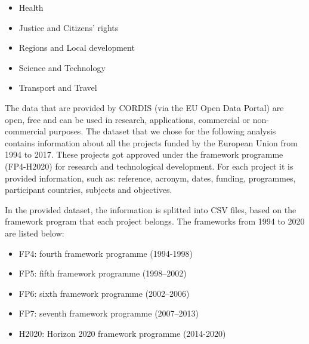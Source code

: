 \documentclass[12pt]{report}
\begin{document}
\begin{itemize}
\item Health
\item Justice and Citizens’ rights
\item Regions and Local development
\item Science and Technology
\item Transport and Travel
\end{itemize}

The data that are provided by CORDIS (via the EU Open Data Portal) are open, free and can be used in research, applications, commercial or non-commercial purposes. The dataset that we chose for the following analysis contains information about all the projects funded by the European Union from 1994 to 2017. These projects got approved under the framework programme (FP4-H2020) for research and technological development. For each project it is provided information, such as: reference, acronym, dates, funding, programmes, participant countries, subjects and objectives.

In the provided dataset, the information is splitted into CSV files, based on the framework program that each project belongs. The frameworks from 1994 to 2020 are listed below:

\begin{itemize}
\item FP4: fourth framework programme (1994-1998)
\item FP5: fifth framework programme (1998–2002)
\item FP6: sixth framework programme (2002–2006)
\item FP7: seventh framework programme (2007–2013)
\item H2020: Horizon 2020 framework programme (2014-2020)
\end{itemize}
\end{document}
